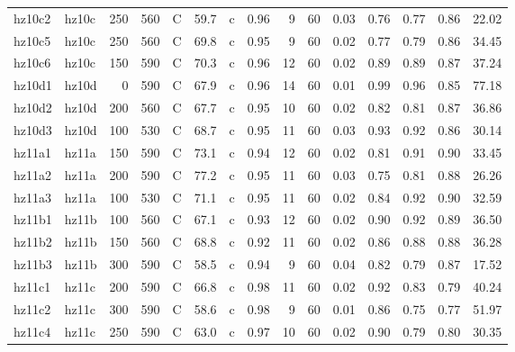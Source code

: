 \documentclass{article}
\begin{document}
\begin{landscape}
\begin{longtable}{llrrlrlrrrrrrrr}
      hz10c2 &      hz10c &  250 &  560 &     C &    59.7 &   c &  0.96 &   9 &         60 &  0.03 &  0.76 &  0.77 &  0.86 &   22.02 \\
      hz10c5 &      hz10c &  250 &  560 &     C &    69.8 &   c &  0.95 &   9 &         60 &  0.02 &  0.77 &  0.79 &  0.86 &   34.45 \\
      hz10c6 &      hz10c &  150 &  590 &     C &    70.3 &   c &  0.96 &  12 &         60 &  0.02 &  0.89 &  0.89 &  0.87 &   37.24 \\
      hz10d1 &      hz10d &    0 &  590 &     C &    67.9 &   c &  0.96 &  14 &         60 &  0.01 &  0.99 &  0.96 &  0.85 &   77.18 \\
      hz10d2 &      hz10d &  200 &  560 &     C &    67.7 &   c &  0.95 &  10 &         60 &  0.02 &  0.82 &  0.81 &  0.87 &   36.86 \\
      hz10d3 &      hz10d &  100 &  530 &     C &    68.7 &   c &  0.95 &  11 &         60 &  0.03 &  0.93 &  0.92 &  0.86 &   30.14 \\
      hz11a1 &      hz11a &  150 &  590 &     C &    73.1 &   c &  0.94 &  12 &         60 &  0.02 &  0.81 &  0.91 &  0.90 &   33.45 \\
      hz11a2 &      hz11a &  200 &  590 &     C &    77.2 &   c &  0.95 &  11 &         60 &  0.03 &  0.75 &  0.81 &  0.88 &   26.26 \\
      hz11a3 &      hz11a &  100 &  530 &     C &    71.1 &   c &  0.95 &  11 &         60 &  0.02 &  0.84 &  0.92 &  0.90 &   32.59 \\
      hz11b1 &      hz11b &  100 &  560 &     C &    67.1 &   c &  0.93 &  12 &         60 &  0.02 &  0.90 &  0.92 &  0.89 &   36.50 \\
      hz11b2 &      hz11b &  150 &  560 &     C &    68.8 &   c &  0.92 &  11 &         60 &  0.02 &  0.86 &  0.88 &  0.88 &   36.28 \\
      hz11b3 &      hz11b &  300 &  590 &     C &    58.5 &   c &  0.94 &   9 &         60 &  0.04 &  0.82 &  0.79 &  0.87 &   17.52 \\
      hz11c1 &      hz11c &  200 &  590 &     C &    66.8 &   c &  0.98 &  11 &         60 &  0.02 &  0.92 &  0.83 &  0.79 &   40.24 \\
      hz11c2 &      hz11c &  300 &  590 &     C &    58.6 &   c &  0.98 &   9 &         60 &  0.01 &  0.86 &  0.75 &  0.77 &   51.97 \\
      hz11c4 &      hz11c &  250 &  590 &     C &    63.0 &   c &  0.97 &  10 &         60 &  0.02 &  0.90 &  0.79 &  0.80 &   30.35 \\

\end{longtable}
\end{landscape}
\end{document}

